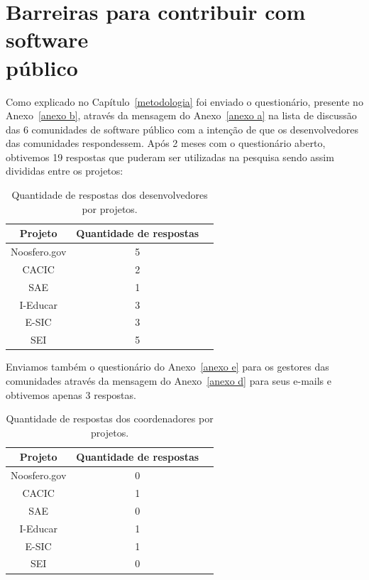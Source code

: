 \chapter{Barreiras para contribuir com software \\público}
\label{barreiras_publico}

Como explicado no Capítulo~\ref{metodologia} foi enviado o questionário, 
presente no Anexo~\ref{anexo b}, através da mensagem do Anexo~\ref{anexo a} 
na lista de discussão das 6 comunidades de software público com 
a intenção de que os desenvolvedores das comunidades respondessem. Após 2 
meses com o questionário aberto, obtivemos 19 respostas que puderam ser 
utilizadas na pesquisa sendo assim divididas entre os projetos:

\begin{table}[h]
	\centering
	\begin{tabular}{ccc}
		\toprule
		\textbf{Projeto} & \textbf{Quantidade de respostas} \\
		\midrule
		Noosfero.gov & 5 \\
		CACIC & 2 \\
		SAE & 1 \\
		I-Educar & 3 \\
		E-SIC & 3 \\
		SEI & 5 \\
		\bottomrule
	\end{tabular}

	\caption{Quantidade de respostas dos desenvolvedores por projetos.}
	\label{tab01}
\end{table}
  

Enviamos também o questionário do Anexo~\ref{anexo e} para os gestores das 
comunidades através da mensagem do Anexo~\ref{anexo d} para seus e-mails e
obtivemos apenas 3 respostas.

\begin{table}[h]
	\centering
	\begin{tabular}{ccc}
		\toprule
		\textbf{Projeto} & \textbf{Quantidade de respostas} \\
		\midrule
		Noosfero.gov & 0 \\
		CACIC & 1 \\
		SAE & 0 \\
		I-Educar & 1 \\
		E-SIC & 1 \\
		SEI & 0 \\
		\bottomrule
	\end{tabular}

	\caption{Quantidade de respostas dos coordenadores por projetos.}
	\label{tab02}
\end{table}



